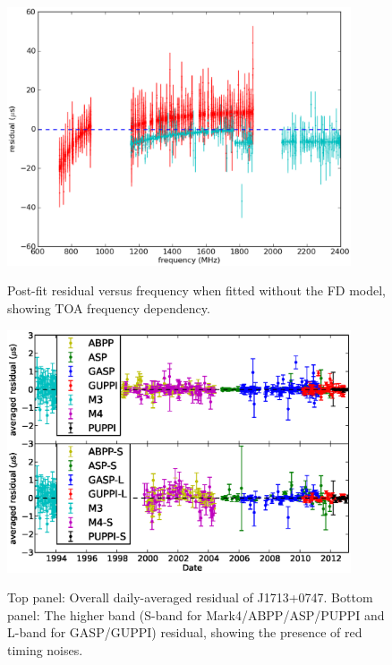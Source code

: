 \documentclass[12pt,preprint]{aastex}
\begin{document}
\begin{figure}
\includegraphics[width=4in]{FD.ps} \\ 
\caption {\label{fig:FD} Post-fit residual versus frequency when fitted
without the FD model, showing TOA frequency dependency.} 
\end{figure} 

\begin{figure}
\includegraphics[width=4in]{residual.eps} \\ 
\caption {\label{fig:res} Top panel: Overall daily-averaged residual of
J1713+0747. Bottom panel: The higher band (S-band for Mark4/ABPP/ASP/PUPPI and
L-band for GASP/GUPPI) residual, showing the presence of red timing noises.} 
\end{figure} 
\end{document}
